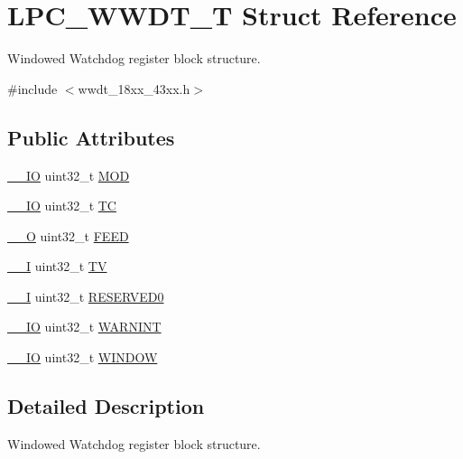 \hypertarget{struct_l_p_c___w_w_d_t___t}{}\section{L\+P\+C\+\_\+\+W\+W\+D\+T\+\_\+T Struct Reference}
\label{struct_l_p_c___w_w_d_t___t}


Windowed Watchdog register block structure.  




{\ttfamily \#include $<$wwdt\+\_\+18xx\+\_\+43xx.\+h$>$}

\subsection*{Public Attributes}
\begin{DoxyCompactItemize}
\item 
\hyperlink{core__sc300_8h_aec43007d9998a0a0e01faede4133d6be}{\+\_\+\+\_\+\+IO} uint32\+\_\+t \hyperlink{struct_l_p_c___w_w_d_t___t_a92ea6cd2032ed81f7c5f626b48c4c772}{M\+OD}
\item 
\hyperlink{core__sc300_8h_aec43007d9998a0a0e01faede4133d6be}{\+\_\+\+\_\+\+IO} uint32\+\_\+t \hyperlink{struct_l_p_c___w_w_d_t___t_a8390ac91aea3330b363ad2fd5dc97f98}{TC}
\item 
\hyperlink{core__sc300_8h_a7e25d9380f9ef903923964322e71f2f6}{\+\_\+\+\_\+O} uint32\+\_\+t \hyperlink{struct_l_p_c___w_w_d_t___t_a80b357a30f90ba82fd46ff1faa8fe4b8}{F\+E\+ED}
\item 
\hyperlink{core__sc300_8h_af63697ed9952cc71e1225efe205f6cd3}{\+\_\+\+\_\+I} uint32\+\_\+t \hyperlink{struct_l_p_c___w_w_d_t___t_a8257032e074282d5242e1d2a07537db1}{TV}
\item 
\hyperlink{core__sc300_8h_af63697ed9952cc71e1225efe205f6cd3}{\+\_\+\+\_\+I} uint32\+\_\+t \hyperlink{struct_l_p_c___w_w_d_t___t_af47cdcbd1ae7b068bf6b66566a140aa6}{R\+E\+S\+E\+R\+V\+E\+D0}
\item 
\hyperlink{core__sc300_8h_aec43007d9998a0a0e01faede4133d6be}{\+\_\+\+\_\+\+IO} uint32\+\_\+t \hyperlink{struct_l_p_c___w_w_d_t___t_a6efaed3716fc4661ef3a7a52bcc9028a}{W\+A\+R\+N\+I\+NT}
\item 
\hyperlink{core__sc300_8h_aec43007d9998a0a0e01faede4133d6be}{\+\_\+\+\_\+\+IO} uint32\+\_\+t \hyperlink{struct_l_p_c___w_w_d_t___t_abcc1eca1d9cc366b693a5333fb75d1e0}{W\+I\+N\+D\+OW}
\end{DoxyCompactItemize}


\subsection{Detailed Description}
Windowed Watchdog register block structure. 

